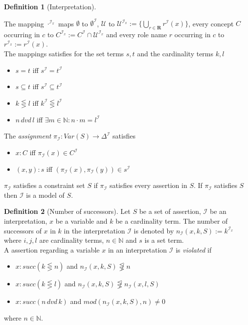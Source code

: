 \documentclass[a4paper,11pt]{scrartcl}
\theoremstyle{break}
\theoremstyle{definition}
\newtheorem{mydef}{Definition}
\begin{document}
\begin{mydef}[Interpretation]
\begin{itemize}
\end{itemize}
The mapping $\cdot^{\mathcal{I}_x}$ maps $\emptyset$ to $\emptyset^\mathcal{I}$, $\mathcal{U}$ to $\mathcal{U}^{\mathcal{I}_x}:=\{\bigcup_{r\in\mathbf{R}}r^\mathcal{I}(x)\}$, every concept $C$ occurring in $c$ to $C^{\mathcal{I}_x}:=C^\mathcal{I}\cap \mathcal{U}^{\mathcal{I}_x}$ and every role name $r$ occurring in $c$ to $r^{\mathcal{I}_x}:=r^\mathcal{I}(x)$.\\
The mappings satisfies for the set terms $s,t$ and the cardinality terms $k,l$
\begin{itemize}
\item $s=t$ iff $s^\mathcal{I}=t^\mathcal{I}$
\item $s\subseteq t$ iff $s^\mathcal{I}\subseteq t^\mathcal{I}$
\item $k\lesseqgtr l$ iff $k^\mathcal{I}\lesseqgtr l^\mathcal{I}$
\item $n\,dvd\,l$ iff $\exists m\in\mathbb{N}:n\cdot m = l^\mathcal{I}$
\end{itemize}
The \textit{assignment} $\pi_\mathcal{I}:Var(S)\rightarrow\Delta^\mathcal{I}$ satisfies
\begin{itemize}
\item $x:C$ iff $\pi_\mathcal{I}(x)\in C^\mathcal{I}$ 
\item $(x,y):s$ iff $(\pi_\mathcal{I}(x),\pi_\mathcal{I}(y))\in s^\mathcal{I}$
\end{itemize} 
$\pi_\mathcal{I}$ satisfies a constraint set $S$ if $\pi_\mathcal{I}$ satisfies every assertion in $S$. If $\pi_\mathcal{I}$ satisfies $S$ then $\mathcal{I}$ is a model of $S$.
\end{mydef}
\begin{mydef}[Number of successors]
Let $S$ be a set of assertion, $\mathcal{I}$ be an interpretation, $x$ be a variable and $k$ be a cardinality term. The number of successors of $x$ in $k$ in the interpretation $\mathcal{I}$ is denoted by $n_\mathcal{I}(x,k,S):=k^{\mathcal{I}_x}$
where $i,j,l$ are cardinality terms, $n\in\mathbb{N}$ and $s$ is a set term.\\
A assertion regarding a variable $x$ in an interpretation $\mathcal{I}$ is \textit{violated} if
\begin{itemize}
\item $x:succ(k\lesseqgtr n)$ and $n_\mathcal{I}(x,k,S)\not\lesseqgtr n$
\item $x:succ(k\lesseqgtr l)$ and $n_\mathcal{I}(x,k,S)\not\lesseqgtr n_\mathcal{I}(x,l,S)$
\item $x:succ(n\,dvd\,k)$ and $mod(n_\mathcal{I}(x,k,S),n)\neq 0$
\end{itemize} 
where $n\in\mathbb{N}$.
\end{mydef}
\end{document}

